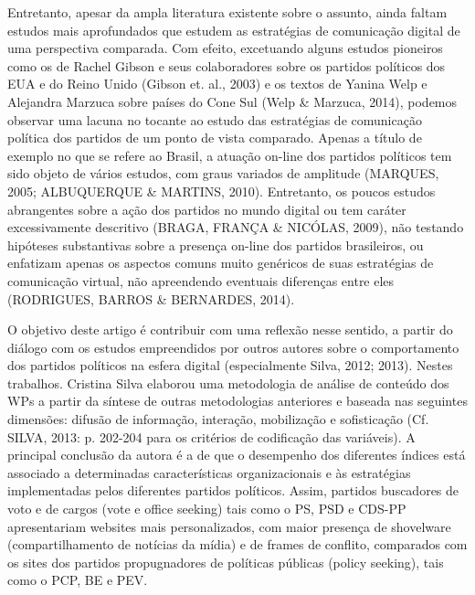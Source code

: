 Entretanto, apesar da ampla literatura existente sobre o assunto, ainda
faltam estudos mais aprofundados que estudem as estratégias de
comunicação digital de uma perspectiva comparada. Com efeito, excetuando
alguns estudos pioneiros como os de Rachel Gibson e seus colaboradores
sobre os partidos políticos dos EUA e do Reino Unido (Gibson et. al.,
2003) e os textos de Yanina Welp e Alejandra Marzuca sobre países do
Cone Sul (Welp \& Marzuca, 2014), podemos observar uma lacuna no tocante
ao estudo das estratégias de comunicação política dos partidos de um
ponto de vista comparado. Apenas a título de exemplo no que se refere ao
Brasil, a atuação on-line dos partidos políticos tem sido objeto de
vários estudos, com graus variados de amplitude (MARQUES, 2005;
ALBUQUERQUE \& MARTINS, 2010). Entretanto, os poucos estudos abrangentes
sobre a ação dos partidos no mundo digital ou tem caráter excessivamente
descritivo (BRAGA, FRANÇA \& NICÓLAS, 2009), não testando hipóteses
substantivas sobre a presença on-line dos partidos brasileiros, ou
enfatizam apenas os aspectos comuns muito genéricos de suas estratégias
de comunicação virtual, não apreendendo eventuais diferenças entre eles
(RODRIGUES, BARROS \& BERNARDES, 2014).

O objetivo deste artigo é contribuir com uma reflexão nesse sentido, a
partir do diálogo com os estudos empreendidos por outros autores sobre o
comportamento dos partidos políticos na esfera digital (especialmente
Silva, 2012; 2013). Nestes trabalhos. Cristina Silva elaborou uma
metodologia de análise de conteúdo dos WPs a partir da síntese de outras
metodologias anteriores e baseada nas seguintes dimensões: difusão de
informação, interação, mobilização e sofisticação (Cf. SILVA, 2013: p.
202-204 para os critérios de codificação das variáveis). A principal
conclusão da autora é a de que o desempenho dos diferentes índices está
associado a determinadas características organizacionais e às
estratégias implementadas pelos diferentes partidos políticos. Assim,
partidos buscadores de voto e de cargos (vote e office seeking) tais
como o PS, PSD e CDS-PP apresentariam websites mais personalizados, com
maior presença de shovelware (compartilhamento de notícias da mídia) e
de frames de conflito, comparados com os sites dos partidos
propugnadores de políticas públicas (policy seeking), tais como o PCP,
BE e PEV.

